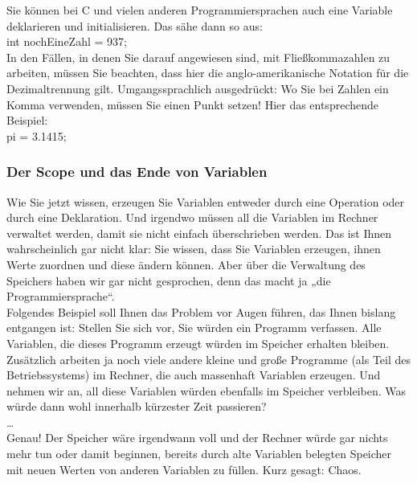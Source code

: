Sie können bei C und vielen anderen Programmiersprachen auch eine Variable deklarieren und initialisieren. Das sähe dann so aus:\\

int nochEineZahl = 937;\\

In den Fällen, in denen Sie darauf angewiesen sind, mit Fließkommazahlen zu arbeiten, müssen Sie beachten, dass hier die anglo-amerikanische Notation für die Dezimaltrennung gilt. Umgangssprachlich ausgedrückt: Wo Sie bei Zahlen ein Komma verwenden, müssen Sie einen Punkt setzen! Hier das entsprechende Beispiel:\\

pi = 3.1415;\\

\subsubsection{Der Scope und das Ende von Variablen}

Wie Sie jetzt wissen, erzeugen Sie Variablen entweder durch eine Operation oder durch eine Deklaration. Und irgendwo müssen all die Variablen im Rechner verwaltet werden, damit sie nicht einfach überschrieben werden. Das ist Ihnen wahrscheinlich gar nicht klar: Sie wissen, dass Sie Variablen erzeugen, ihnen Werte zuordnen und diese ändern können. Aber über die Verwaltung des Speichers haben wir gar nicht gesprochen, denn das macht ja „die Programmiersprache“.\\

Folgendes Beispiel soll Ihnen das Problem vor Augen führen, das Ihnen bislang entgangen ist: Stellen Sie sich vor, Sie würden ein Programm verfassen. Alle Variablen, die dieses Programm erzeugt würden im Speicher erhalten bleiben. Zusätzlich arbeiten ja noch viele andere kleine und große Programme (als Teil des Betriebssystems) im Rechner, die auch massenhaft Variablen erzeugen. Und nehmen wir an, all diese Variablen würden ebenfalls im Speicher verbleiben. Was würde dann wohl innerhalb kürzester Zeit passieren?\\

…\\

Genau! Der Speicher wäre irgendwann voll und der Rechner würde gar nichts mehr tun oder damit beginnen, bereits durch alte Variablen belegten Speicher mit neuen Werten von anderen Variablen zu füllen. Kurz gesagt: Chaos.\\

